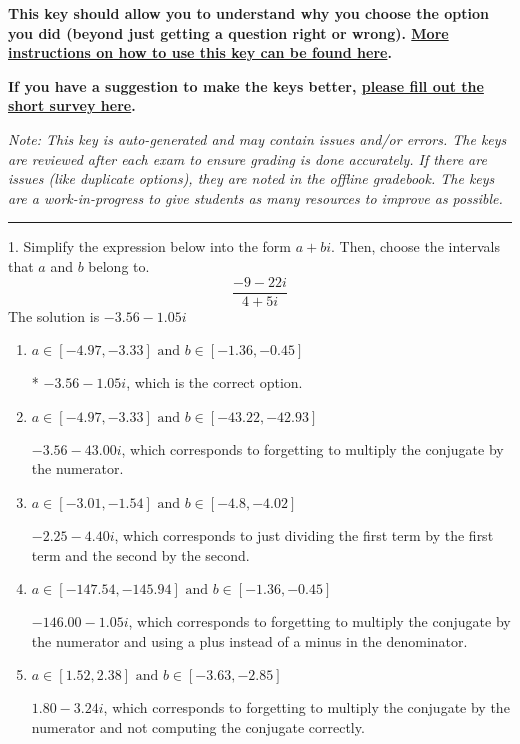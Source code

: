 \documentclass{article}[14pt]
\begin{document}
\textbf{This key should allow you to understand why you choose the option you did (beyond just getting a question right or wrong). \href{https://xronos.clas.ufl.edu/mac1105spring2020/courseDescriptionAndMisc/Exams/LearningFromResults}{More instructions on how to use this key can be found here}.}

\textbf{If you have a suggestion to make the keys better, \href{https://forms.gle/CZkbZmPbC9XALEE88}{please fill out the short survey here}.}

\textit{Note: This key is auto-generated and may contain issues and/or errors. The keys are reviewed after each exam to ensure grading is done accurately. If there are issues (like duplicate options), they are noted in the offline gradebook. The keys are a work-in-progress to give students as many resources to improve as possible.}

\rule{\textwidth}{0.4pt}

1. Simplify the expression below into the form $a+bi$. Then, choose the intervals that $a$ and $b$ belong to.
$$ \frac{-9  - 22 i}{4  + 5 i} $$ 
The solution is $ -3.56  - 1.05 i $ 

\begin{enumerate}[label=\Alph*.] 
\item $ a \in [-4.97, -3.33] \text{ and } b \in [-1.36, -0.45] $ 

 * $-3.56  - 1.05 i$, which is the correct option. 
\item $ a \in [-4.97, -3.33] \text{ and } b \in [-43.22, -42.93] $ 

  $-3.56  - 43.00 i$, which corresponds to forgetting to multiply the conjugate by the numerator. 
\item $ a \in [-3.01, -1.54] \text{ and } b \in [-4.8, -4.02] $ 

  $-2.25  - 4.40 i$, which corresponds to just dividing the first term by the first term and the second by the second. 
\item $ a \in [-147.54, -145.94] \text{ and } b \in [-1.36, -0.45] $ 

  $-146.00  - 1.05 i$, which corresponds to forgetting to multiply the conjugate by the numerator and using a plus instead of a minus in the denominator. 
\item $ a \in [1.52, 2.38] \text{ and } b \in [-3.63, -2.85] $ 

  $1.80  - 3.24 i$, which corresponds to forgetting to multiply the conjugate by the numerator and not computing the conjugate correctly. 
\end{enumerate} 
 
\end{document}
